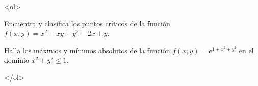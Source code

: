 \documentclass[12pt]{article}
\begin{document}
\bigskip

            
\bigskip
\bigskip
\bigskip






<ol>

\item Encuentra y clasifica los puntos críticos de la función $f(x,y)=x^2-xy+y^2-2x+y$.


  \vspace{8cm}


\item  Halla los máximos y mínimos absolutos de la función $f(x,y)=e^{1+x^2+y^2}$
en el dominio $x^2+y^2 \leq 1$.

  

</ol>
 





  
\end{document}
